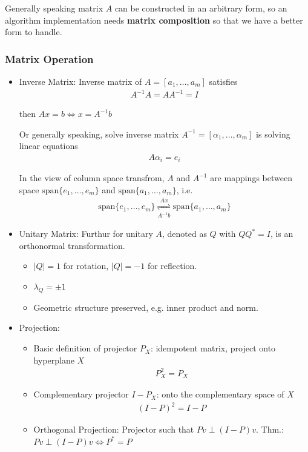     Generally speaking matrix $ A $ can be constructed in an arbitrary form, so an algorithm implementation needs \textbf{matrix composition} so that we have a better form to handle.
    




\subsubsection{Matrix Operation}
\begin{itemize}[topsep=2pt,itemsep=0pt]
    \item Inverse Matrix: Inverse matrix of $ A=[a_1,\ldots,a_m] $ satisfies
    \begin{align}
        A^{-1}A=AA^{-1}=I 
    \end{align}

    then $ Ax=b\Leftrightarrow x= A^{-1}b$    

    Or generally speaking, solve inverse matrix $ A^{-1}=[\alpha_1,\ldots,\alpha _m] $ is solving linear equations 
    \begin{align}
        A\alpha _i=e_i
    \end{align}
    
    In the view of column space transfrom, $ A $ and $ A^{-1} $ are mappings between space $ \mathrm{span}\{e_1,\ldots,e_m\}  $ and $ \mathrm{span}\{a_1,\ldots,a_m\}  $, i.e.
    \begin{align}
        \mathrm{span}\{e_1,\ldots,e_m\} \mathop{\rightleftharpoons }\limits_{A^{-1}b}^{Ax}  \mathrm{span}\{a_1,\ldots,a_m\}
    \end{align}
    
    \item Unitary Matrix: Furthur for unitary $ A $, denoted as $ Q $ with $ QQ^*=I $, is an orthonormal transformation.
\begin{itemize}[topsep=2pt,itemsep=0pt]
    \item $ |Q|=1 $ for rotation, $ |Q|=-1 $ for reflection.
    \item $ \lambda_Q=\pm 1 $
    \item Geometric structure preserved, e.g. inner product and norm.
\end{itemize}

    \item Projection: 
    \begin{itemize}
        \item Basic definition of projector $ P_X $: idempotent matrix, project onto hyperplane $ X $ 
        \begin{align}
            P_X^2=P_X 
        \end{align}        
        \item Complementary projector $ I-P_X $: onto the complementary space of $ X $
        \begin{align}
             (I-P)^2=I-P
        \end{align}
        \item Orthogonal Projection: Projector such that $ Pv\perp (I-P)v $. Thm.: $ Pv\perp (I-P)v\Leftrightarrow P^*=P $
        

\end{itemize}
\end{itemize}
